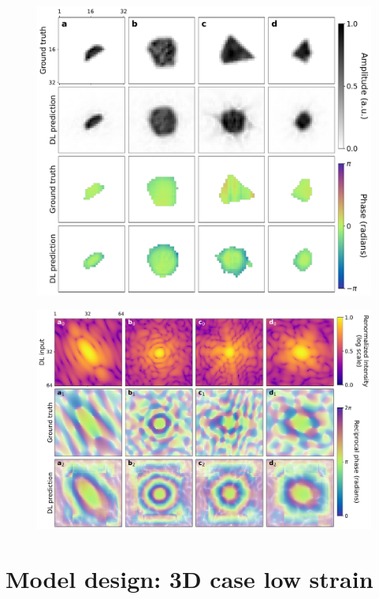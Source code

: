 \begin{figure}[H]
    \centering
    \includegraphics[width=.8\textwidth]{figures/Phasing/obj_low_strain_doubleMSE.pdf}
    \caption{}
    \label{fig:obj_lowStrain_doubleMSE}
\end{figure}

\begin{figure}[H]
    \centering
    \includegraphics[width=.8\textwidth]{figures/Phasing/RSP_low_strain_doubleMSE.pdf}
    \caption{}
    \label{fig:RSP_lowStrain_doubleMSE}
\end{figure}









\section{Model design: 3D case low strain }\label{chp:3d_nostrain}

